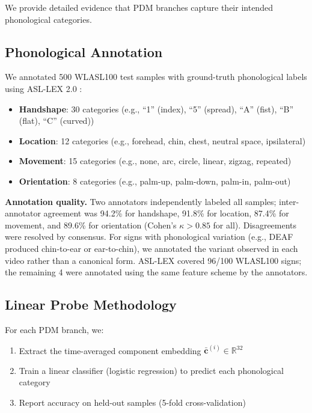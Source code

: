\documentclass{article}
\theoremstyle{definition}
\theoremstyle{remark}
\begin{document}
We provide detailed evidence that PDM branches capture their intended phonological categories.

\subsection{Phonological Annotation}

We annotated 500 WLASL100 test samples with ground-truth phonological labels using ASL-LEX 2.0 \citep{caselli2017asl}:
\begin{itemize}[nosep,topsep=2pt,leftmargin=*]
\item \textbf{Handshape}: 30 categories (e.g., ``1'' (index), ``5'' (spread), ``A'' (fist), ``B'' (flat), ``C'' (curved))
\item \textbf{Location}: 12 categories (e.g., forehead, chin, chest, neutral space, ipsilateral)
\item \textbf{Movement}: 15 categories (e.g., none, arc, circle, linear, zigzag, repeated)
\item \textbf{Orientation}: 8 categories (e.g., palm-up, palm-down, palm-in, palm-out)
\end{itemize}

\textbf{Annotation quality.} Two annotators independently labeled all samples; inter-annotator agreement was 94.2\% for handshape, 91.8\% for location, 87.4\% for movement, and 89.6\% for orientation (Cohen's $\kappa > 0.85$ for all). Disagreements were resolved by consensus. For signs with phonological variation (e.g., DEAF produced chin-to-ear or ear-to-chin), we annotated the variant observed in each video rather than a canonical form. ASL-LEX covered 96/100 WLASL100 signs; the remaining 4 were annotated using the same feature scheme by the annotators.

\subsection{Linear Probe Methodology}

For each PDM branch, we:
\begin{enumerate}[nosep,topsep=2pt]
\item Extract the time-averaged component embedding $\bar{\mathbf{c}}^{(i)} \in \mathbb{R}^{32}$
\item Train a linear classifier (logistic regression) to predict each phonological category
\item Report accuracy on held-out samples (5-fold cross-validation)
\end{enumerate}
\end{document}
